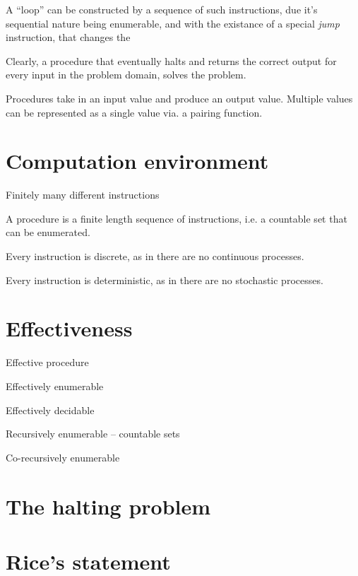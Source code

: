 A ``loop'' can be constructed by a sequence of such instructions, due it's
sequential nature being enumerable, and with the existance of a special
\emph{jump} instruction, that changes the 

Clearly, a procedure that eventually halts and returns the correct output for
every input in the problem domain, solves the problem.


Procedures take in an input value and produce an output value. Multiple values
can be represented as a single value via. a pairing function.



\section{Computation environment}

Finitely many different instructions

A procedure is a finite length sequence of instructions, i.e. a countable set
that can be enumerated.

Every instruction is discrete, as in there are no continuous processes.

Every instruction is deterministic, as in there are no stochastic processes.

\section{Effectiveness}

Effective procedure

Effectively enumerable

Effectively decidable

Recursively enumerable -- countable sets

Co-recursively enumerable



\section{The halting problem}

\section{Rice's statement}
